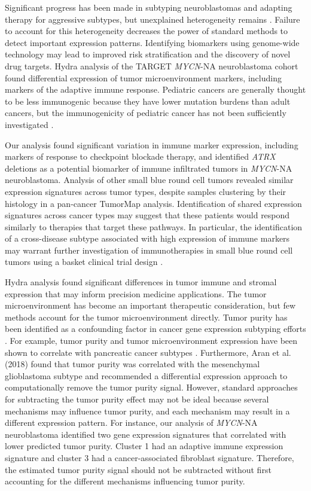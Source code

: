 \documentclass[10pt,letterpaper]{article}
\begin{document}
Significant progress has been made in subtyping neuroblastomas and adapting therapy for aggressive subtypes, but unexplained heterogeneity remains \cite{morgensternChallengeDefiningUltrahighrisk2019}. Failure to account for this heterogeneity decreases the power of standard methods to detect important expression patterns. Identifying biomarkers using genome-wide technology may lead to improved risk stratification and the discovery of novel drug targets. Hydra analysis of the TARGET \textit{MYCN}-NA neuroblastoma cohort found differential expression of tumor microenvironment markers, including markers of the adaptive immune response. Pediatric cancers are generally thought to be less immunogenic because they have lower mutation burdens than adult cancers, but the immunogenicity of pediatric cancer has not been sufficiently investigated \cite{majzner2017harnessing, zamoraPediatricPatientsAcute2019}.

Our analysis found significant variation in immune marker expression, including markers of response to checkpoint blockade therapy, and identified \textit{ATRX} deletions as a potential biomarker of immune infiltrated tumors in \textit{MYCN}-NA neuroblastoma. Analysis of other small blue round cell tumors revealed similar expression signatures across tumor types, despite samples clustering by their histology in a pan-cancer TumorMap analysis. Identification of shared expression signatures across cancer types may suggest that these patients would respond similarly to therapies that target these pathways. In particular, the identification of a cross-disease subtype associated with high expression of immune markers may warrant further investigation of immunotherapies in small blue round cell tumors using a basket clinical trial design \cite{cunananEfficientBasketTrial2017}.

Hydra analysis found significant differences in tumor immune and stromal expression that may inform precision medicine applications. The tumor microenvironment has become an important therapeutic consideration, but few methods account for the tumor microenvironment directly. Tumor purity has been identified as a confounding factor in cancer gene expression subtyping efforts \cite{rheeImpactTumorPurity2018}. For example, tumor purity and tumor microenvironment expression have been shown to correlate with pancreatic cancer subtypes \cite{raphael2017integrated}. Furthermore, Aran et al. (2018) found that tumor purity was correlated with the mesenchymal glioblastoma subtype and recommended a differential expression approach to computationally remove the tumor purity signal. However, standard approaches for subtracting the tumor purity effect may not be ideal because several mechanisms may influence tumor purity, and each mechanism may result in a different expression pattern. For instance, our analysis of \textit{MYCN}-NA neuroblastoma identified two gene expression signatures that correlated with lower predicted tumor purity. Cluster 1 had an adaptive immune expression signature and cluster 3 had a cancer-associated fibroblast signature. Therefore, the estimated tumor purity signal should not be subtracted without first accounting for the different mechanisms influencing tumor purity.
\end{document}
